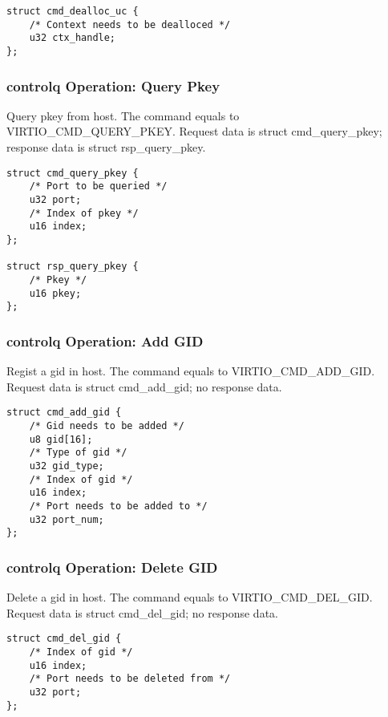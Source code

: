 \begin{lstlisting}
struct cmd_dealloc_uc {
    /* Context needs to be dealloced */
    u32 ctx_handle;
};
\end{lstlisting}

\subsubsection{controlq Operation: Query Pkey}\label{sec:Device Types / RDMA Device / controlq Operation / Query Pkey}

Query pkey from host. The command equals to VIRTIO_CMD_QUERY_PKEY.
Request data is struct cmd_query_pkey; response data is struct rsp_query_pkey.

\begin{lstlisting}
struct cmd_query_pkey {
    /* Port to be queried */
    u32 port;
    /* Index of pkey */
    u16 index;
};

struct rsp_query_pkey {
    /* Pkey */
    u16 pkey;
};
\end{lstlisting}

\subsubsection{controlq Operation: Add GID}\label{sec:Device Types / RDMA Device / controlq Operation / Add GID}

Regist a gid in host. The command equals to VIRTIO_CMD_ADD_GID.
Request data is struct cmd_add_gid; no response data.

\begin{lstlisting}
struct cmd_add_gid {
    /* Gid needs to be added */
    u8 gid[16];
    /* Type of gid */
    u32 gid_type;
    /* Index of gid */
    u16 index;
    /* Port needs to be added to */
    u32 port_num;
};
\end{lstlisting}

\subsubsection{controlq Operation: Delete GID}\label{sec:Device Types / RDMA Device / controlq Operation / Delete GID}

Delete a gid in host. The command equals to VIRTIO_CMD_DEL_GID.
Request data is struct cmd_del_gid; no response data.

\begin{lstlisting}
struct cmd_del_gid {
    /* Index of gid */
    u16 index;
    /* Port needs to be deleted from */
    u32 port;
};
\end{lstlisting}

